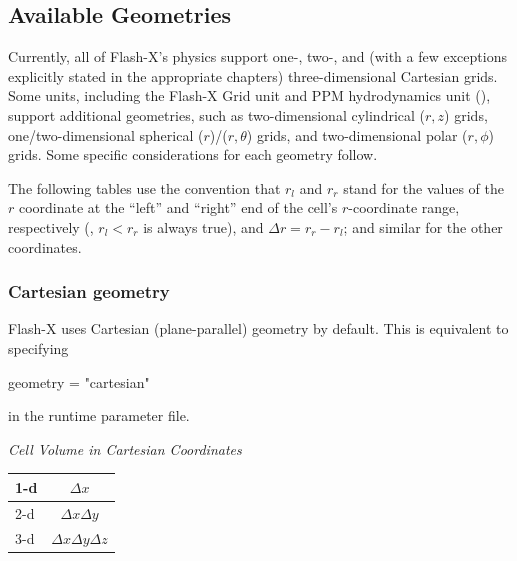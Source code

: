 \subsection{Available Geometries}

Currently, all of Flash-X's physics support one-, two-, and
(with a few exceptions explicitly stated in the appropriate chapters) three-dimensional
Cartesian grids.
Some units, including the Flash-X
\unit{Grid} unit and PPM hydrodynamics unit (),
support additional geometries, such as two-dimensional cylindrical ($r,z$) grids,
one/two-dimensional spherical ($r$)/($r, \theta$) grids, and two-dimensional polar
($r, \phi$) grids. Some specific considerations for each geometry follow.

The following tables use the convention that
$r_l$ and $r_r$ stand for the values of the $r$ coordinate at the ``left'' and
``right'' end of the cell's $r$-coordinate range, respectively (\ie,
$r_l < r_r$ is always true), and $\Delta r = r_r-r_l$; and similar for
the other coordinates.

\subsubsection{Cartesian geometry}

Flash-X uses Cartesian (plane-parallel) geometry by default. This is
equivalent to specifying
\begin{codeseg}
   geometry = "cartesian"
\end{codeseg}
in the runtime parameter file.


{\it Cell Volume in Cartesian Coordinates}
\begin{minipage}{6in}
\renewcommand{\arraystretch}{1.5}
\begin{center}
\begin{tabular}{|l|c|}
\hline
1-d & $\Delta x$ \\
\hline
2-d & $\Delta x \Delta y$ \\
\hline
3-d & $\Delta x \Delta y \Delta z$  \\
\hline
\end{tabular}
\end{center}
\end{minipage}
%


